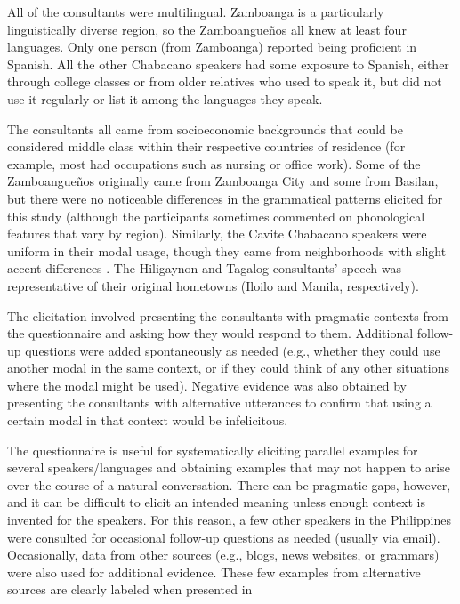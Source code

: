 \documentclass[output=paper]{langsci/langscibook}
\begin{document}
All of the consultants were multilingual. Zamboanga is a particularly linguistically diverse region, so the Zamboangueños all knew at least four languages. Only one person (from Zamboanga) reported being proficient in Spanish. All the other Chabacano speakers had some exposure to Spanish, either through college classes or from older relatives who used to speak it, but did not use it regularly or list it among the languages they speak.

The consultants all came from socioeconomic backgrounds that could be considered middle class within their respective countries of residence (for example, most had occupations such as nursing or office work). Some of the Zamboangueños originally came from Zamboanga City and some from Basilan, but there were no noticeable differences in the grammatical patterns elicited for this study (although the participants sometimes commented on phonological features that vary by region). Similarly, the Cavite Chabacano speakers were uniform in their modal usage, though they came from neighborhoods with slight accent differences \citep{Lesho2018}. The Hiligaynon and Tagalog consultants’ speech was representative of their original hometowns (Iloilo and Manila, respectively).

The elicitation involved presenting the consultants with pragmatic contexts from the questionnaire and asking how they would respond to them. Additional follow-up questions were added spontaneously as needed (e.g., whether they could use another modal in the same context, or if they could think of any other situations where the modal might be used). Negative evidence was also obtained by presenting the consultants with alternative utterances to confirm that using a certain modal in that context would be infelicitous.  

The \citet{Dahl1985} questionnaire is useful for systematically eliciting parallel examples for several speakers/languages and obtaining examples that may not happen to arise over the course of a natural conversation. There can be pragmatic gaps, however, and it can be difficult to elicit an intended meaning unless enough context is invented for the speakers. For this reason, a few other speakers in the Philippines were consulted for occasional follow-up questions as needed (usually via email). Occasionally, data from other sources (e.g., blogs, news websites, or grammars) were also used for additional evidence. These few examples from alternative sources are clearly labeled when presented in 
\end{document}
